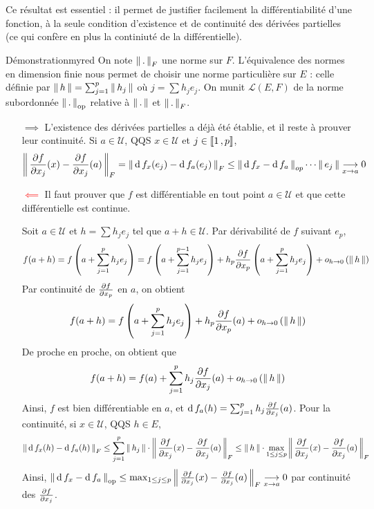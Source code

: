     Ce résultat est essentiel : il permet de justifier facilement la différentiabilité d’une fonction, à la seule condition d’existence et de continuité des dérivées partielles (ce qui confère en plus la continiuté de la différentielle). 

    \begin{demo}{Démonstration}{myred}
        On note $\left\lVert\,.\,\right\rVert_F$ une norme sur $F$. L’équivalence des normes en dimension finie nous permet de choisir une norme particulière sur $E$ : celle définie par $\left\lVert\,h\,\right\rVert = \sum_{j=1}^{p} \left\lVert\,h_j\,\right\rVert$ où $j = \sum h_j e_j$. On munit $\mathcal{L}(E,F)$ de la norme subordonnée $\left\lVert\,.\,\right\rVert_{\text{op}}$ relative à $\left\lVert\,.\,\right\rVert$ et $\left\lVert\,.\,\right\rVert_F$.
        \begin{itemize}
            \item[\textcolor{myred}{$\implies$}] L’existence des dérivées partielles a déjà été établie, et il reste à prouver leur continuité. Si $a \in \mathcal{U}$, QQS $x \in \mathcal{U}$ et $j \in \left\llbracket 1 \, , p \right\rrbracket$, 
            \[ \left\lVert\,\frac{\partial f}{\partial x_j}(x) - \frac{\partial f}{\partial x_j}(a)\,\right\rVert_F = \left\lVert\,\operatorname{d} f_x(e_j) - \operatorname{d} f_a(e_j)\,\right\rVert_F \leq \left\lVert\,\operatorname{d} f_x - \operatorname{d} f_a\,\right\rVert_{op} \cdots \left\lVert\,e_j\,\right\rVert \underset{x \rightarrow a}{\longrightarrow} 0 \]   
            \item[\textcolor{red}{$\impliedby$}] Il faut prouver que $f$ est différentiable en tout point $a \in \mathcal{U}$ et que cette différentielle est continue. 
            
            Soit $a \in \mathcal{U}$ et $h = \sum h_j e_j$ tel que $a + h \in \mathcal{U}$. Par dérivabilité de $f$ suivant $e_p$, 
            \[ f(a + h) = f \left(a + \sum_{j = 1}^p h_j e_j\right) = f \left(a + \sum_{j = 1}^{p-1} h_j e_j\right) + h_p \frac{\partial f}{\partial x_p}\left(a + \sum_{j = 1}^p h_j e_j\right) + o_{h \rightarrow 0} \left(\left\lVert\,h\,\right\rVert\right) \]   
            Par continuité de $\frac{\partial f}{\partial x_p}$ en $a$, on obtient 
            \[ f(a+h) = f\left(a + \sum_{j = 1}^p h_j e_j\right) + h_p \frac{\partial f}{\partial x_p}(a) + o_{h \rightarrow 0} \left(\left\lVert\,h\,\right\rVert\right) \]   
            De proche en proche, on obtient que 
            \[ f(a + h) = f(a) + \sum_{j=1}^{p} h_j \frac{\partial f}{\partial x_j} (a) + o_{h \rightarrow 0} \left(\left\lVert\,h\,\right\rVert\right) \]   
            Ainsi, $f$ est bien différentiable en $a$, et $\operatorname{d} f_a(h) = \sum_{j=1}^{p} h_j \frac{\partial f}{\partial x_j}(a)$. Pour la continuité, si $x \in \mathcal{U}$, QQS $h \in E$, 
            \[ \left\lVert\,\operatorname{d} f_x(h) - \operatorname{d} f_a(h)\,\right\rVert_F \leq \sum_{j=1}^{p}\left\lVert\,h_j\,\right\rVert\cdot \left\lVert\,\frac{\partial f}{\partial x_j}(x) - \frac{\partial f}{\partial x_j}(a)\,\right\rVert_F \leq \left\lVert\,h\,\right\rVert \cdot \max_{1\leq j \leq p} \left\lVert\,\frac{\partial f}{\partial x_j}(x) - \frac{\partial f}{\partial x_j}(a)\,\right\rVert_F \]   
            Ainsi, $\left\lVert\,\operatorname{d} f_x - \operatorname{d} f_a\,\right\rVert_{\text{op}} \leq \max_{1\leq j \leq p} \left\lVert\,\frac{\partial f}{\partial x_j}(x) - \frac{\partial f}{\partial x_j}(a)\,\right\rVert_F \underset{x \rightarrow a}{\longrightarrow} 0$ par continuité des $\frac{\partial f}{\partial x_j}$.
        \end{itemize}
    \end{demo}

